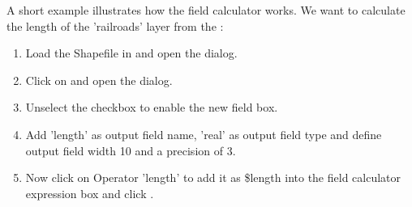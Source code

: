 A short example illustrates how the field calculator works. We want to calculate
the length of the 'railroads' layer from the :

\begin{enumerate}
\item Load the Shapefile  in \qg and open
the  dialog.
\item Click on  and
open the  dialog.
\item Unselect the  checkbox to enable the
new field box.
\item Add 'length' as output field name, 'real' as output field type and define
output field width 10 and a precision of 3.
\item Now click on Operator 'length' to add it as \$length into the
field calculator expression box and click .
\end{enumerate}
